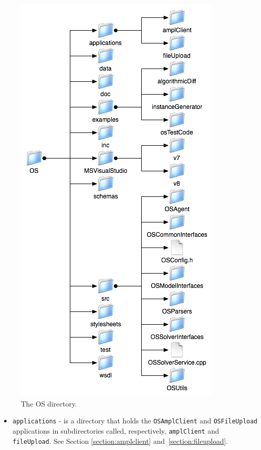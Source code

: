 \documentclass[11pt]{article}
\newcommand{\figurepath}{./figures}
\renewcommand{\_}{{\char"5F}}
\renewcommand{\{}{{\char"7B}}
\renewcommand{\}}{{\char"7D}}
\renewcommand{\^}{{\char"0D}}
\renewcommand{\'}{{\char"0D}}
\begin{document}
\begin{enumerate}[Step 1:]
\begin{figure}
\centering
\includegraphics[scale=0.8]{./figures/OSDirectory.png}
\caption{The OS directory.}
\label{figure:osdirectory}
\end{figure}



\begin{itemize}


\item {\tt applications} - is a directory that holds  the {\tt OSAmplClient} 
and {\tt OSFileUpload}  applications in subdirectories called, respectively, {\tt amplClient} and {\tt fileUpload}.
See Section \ref{section:amplclient} and~\ref{section:fileupload}.


\end{itemize}
\end{enumerate}
\end{document}
